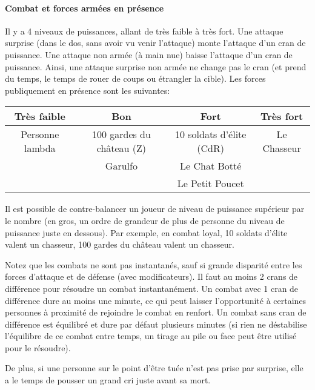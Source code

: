 {	\paragraph{Combat et forces armées en présence} Il y a 4 niveaux de puissances, allant de très faible à très fort. Une attaque surprise (dans le dos, sans avoir vu venir l'attaque) monte l'attaque d'un cran de puissance. Une attaque non armée (à main nue) baisse l'attaque d'un cran de puissance. Ainsi, une attaque surprise non armée ne change pas le cran (et prend du temps, le temps de rouer de coups ou étrangler la cible). Les forces publiquement en présence sont les suivantes:
	\begin{center}
	\begin{tabular}{|c|c|c|c|}
	\hline
	Très faible & Bon & Fort & Très fort \\
	\hline
	Personne lambda & 100 gardes du château (Z) & 10 soldats d'élite (CdR) & Le Chasseur\\
	 & Garulfo & Le Chat Botté & \\
	 & & Le Petit Poucet & \\
	\hline
	\end{tabular}
	\end{center}
	
	\par Il est possible de contre-balancer un joueur de niveau de puissance supérieur par le nombre (en gros, un ordre de grandeur de plus de personne du niveau de puissance juste en dessous). Par exemple,  en combat loyal, 10 soldats d'élite valent un chasseur, 100 gardes du château valent un chasseur.
	
	\par Notez que les combats ne sont pas instantanés, sauf si grande disparité entre les forces d'attaque et de défense (avec modificateurs). Il faut au moins 2 crans de différence pour résoudre un combat instantanément. Un combat avec 1 cran de différence dure au moins une minute, ce qui peut laisser l'opportunité à certaines personnes à proximité de rejoindre le combat en renfort. Un combat sans cran de différence est équilibré et dure par défaut plusieurs minutes (si rien ne déstabilise l'équilibre de ce combat entre temps, un tirage au pile ou face peut être utilisé pour le résoudre).
	
	\par De plus, si une personne sur le point d'être tuée n'est pas prise par surprise, elle a le temps de pousser un grand cri juste avant sa mort.
	
}
